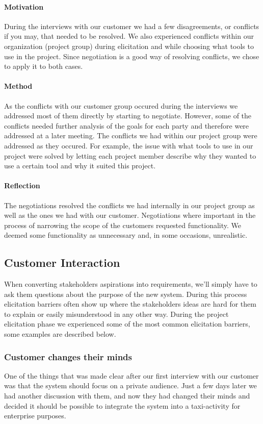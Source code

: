 \documentclass[10pt]{article}
\begin{document}
\paragraph{Motivation}
\hfill \break
During the interviews with our customer we had a few disagreements, or conflicts if you may, that needed to be resolved. We also experienced conflicts within our organization (project group) during elicitation and while choosing what tools to use in the project. Since negotiation is a good way of resolving conflicts, we chose to apply it to both cases.
\paragraph{Method}
\hfill \break
As the conflicts with our customer group occured during the interviews we addressed most of them directly by starting to negotiate. However, some of the conflicts needed further analysis of the goals for each party and therefore were addressed at a later meeting. The conflicts we had within our project group were addressed as they occured. For example, the issue with what tools to use in our project were solved by letting each project member describe why they wanted to use a certain tool and why it suited this project. 
\paragraph{Reflection}
\hfill \break
The negotiations resolved the conflicts we had internally in our project group as well as the ones we had with our customer. Negotiations where important in the process of narrowing the scope of the customers requested functionality. We deemed some functionality as unnecessary and, in some occasions, unrealistic.


\subsection{Customer Interaction}
When converting stakeholders aspirations into requirements, we'll simply have to ask them questions about the purpose of the new system. During this process elicitation barriers often show up where the stakeholders ideas are hard for them to explain or easily misunderstood in any other way.
During the project elicitation phase we experienced some of the most common elicitation barriers, some examples are described below.

\subsubsection{Customer changes their minds}
One of the things that was made clear after our first interview with our customer was that the system should focus on a private audience. Just a few days later we had another discussion with them, and now they had changed their minds and decided it should be possible to integrate the system into a taxi-activity for enterprise purposes.
\end{document}
